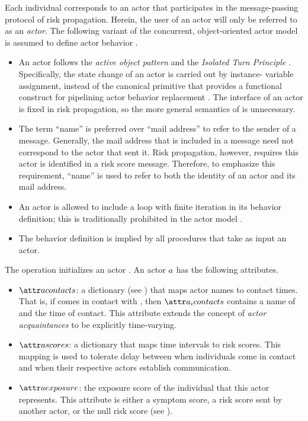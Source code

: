 Each individual corresponds to an actor that participates in the message-passing protocol of risk propagation. Herein, the user of an actor will only be referred to as an \emph{actor}. The following variant of the concurrent, object-oriented actor model is assumed to define actor behavior \citep{Agha1985}.
%
\begin{itemize}
	\item An actor follows the \emph{active object pattern} \citep{Lavender1996, Koster2016} and the \emph{Isolated Turn Principle} \citep{Koster2016}. Specifically, the state change of an actor is carried out by instance- variable assignment, instead of the canonical \cBecome{} primitive that provides a functional construct for pipelining actor behavior replacement \citep{Agha1985}. The interface of an actor is fixed in risk propagation, so the more general semantics of \cBecome{} is unnecessary.
	\item The term ``name'' \citep{Hewitt1977, Agha1985} is preferred over ``mail address'' \citep{Agha1985} to refer to the sender of a message. Generally, the mail address that is included in a message need not correspond to the actor that sent it. Risk propagation, however, requires this actor is identified in a risk score message. Therefore, to emphasize this requirement, ``name'' is used to refer to both the identity of an actor and its mail address.
	\item An actor is allowed to include a loop with finite iteration in its behavior definition; this is traditionally prohibited in the actor model \citep{Agha1985}.
	\item The behavior definition is implied by all procedures that take as input an actor.
\end{itemize}
%
The \cCreateActor{} operation initializes an actor \citep{Agha1985}. An actor $a$ has the following attributes.
%
\begin{itemize}
	\item $\aActorContacts$: a dictionary (see ) that maps actor names to contact times. That is, if  comes in contact with , then $\aContacts{\vActor_i}$ contains a name of  and the time of contact. This attribute extends the concept of \emph{actor acquaintances} \citep{Hewitt1977a, Hewitt1977b, Agha1985} to be explicitly time-varying.
	\item $\aActorScores$: a dictionary that maps time intervals to risk scores. This mapping is used to tolerate delay between when individuals come in contact and when their respective actors establish communication.
	\item $\aActorExposure$: the exposure score of the individual that this actor represents. This attribute is either a symptom score, a risk score sent by another actor, or the null risk score (see \cNullRiskScore{}).
\end{itemize}
